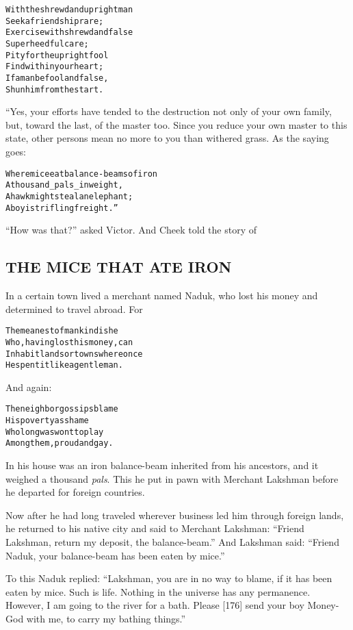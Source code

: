 \documentclass{article}
\renewenvironment{verbatim}{\begin{alltt}\normalfont\begin{centering}}{\end{centering}\end{alltt}}
\begin{document}
\begin{verbatim}
With the shrewd and upright man
    Seek a friendship rare;
Exercise with shrewd and false
    Superheedful care;
Pity for the upright fool
    Find within your heart;
If a man be fool and false,
    Shun him from the start.
\end{verbatim}
“Yes, your efforts have tended to the destruction not only of your
own family, but, toward the last, of the master too. Since you
reduce your own master to this state, other persons mean no more to
you than withered grass. As the saying goes:

\begin{verbatim}
Where mice eat balance-beams of iron
    A thousand _pals_ in weight,
A hawk might steal an elephant;
    A boy is trifling freight.”
\end{verbatim}
``How was that?'' asked Victor. And Cheek told the story of

\subsection{THE MICE THAT ATE IRON}

In a certain town lived a merchant named Naduk, who lost his money
and determined to travel abroad. For

\begin{verbatim}
The meanest of mankind is he
    Who, having lost his money, can
Inhabit lands or towns where once
    He spent it like a gentleman.
\end{verbatim}
And again:

\begin{verbatim}
The neighbor gossips blame
His poverty as shame
Who long was wont to play
Among them, proud and gay.
\end{verbatim}
In his house was an iron balance-beam inherited from his ancestors,
and it weighed a thousand \emph{pals}. This he put in pawn with
Merchant Lakshman before he departed for foreign countries.

Now after he had long traveled wherever business led him through
foreign lands, he returned to his native city and said to Merchant
Lakshman: ``Friend Lakshman, return my deposit, the balance-beam.''
And Lakshman said:
``Friend Naduk, your balance-beam has been eaten by mice.''

To this Naduk replied:
``Lakshman, you are in no way to blame, if it has been eaten by mice. Such is life. Nothing in the universe has any permanence. However, I am going to the river for a bath. Please [176] send your boy Money-God with me, to carry my bathing things.''
\end{document}
